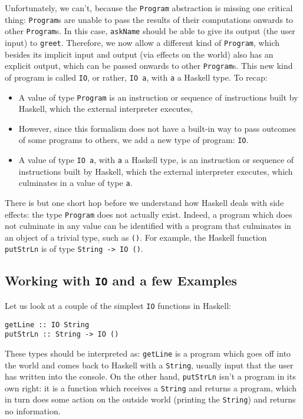 \documentclass[11pt]{article}
\theoremstyle{nonumberplain}
\newcommand*\lsin{\lstinline}
\begin{document}
Unfortunately, we can't, because the \lsin|Program| abstraction is missing one critical thing: \lsin|Program|s are unable to pass the results of their computations onwards to other \lsin|Program|s. In this case, \lsin|askName| should be able to give its output (the user input) to \lsin|greet|. Therefore, we now allow a different kind of \lsin|Program|, which besides its implicit input and output (via effects on the world) also has an explicit output, which can be passed onwards to other \lsin|Program|s. This new kind of program is called \lsin|IO|, or rather, \lsin|IO a|, with \lsin|a| a Haskell type. To recap:
\begin{itemize}
\item A value of type \lsin|Program| is an instruction or sequence of instructions built by Haskell, which the external interpreter executes,
\item However, since this formalism does not have a built-in way to pass outcomes of some programs to others, we add a new type of program: \lsin|IO|.
\item A value of type \lsin|IO a|, with \lsin|a| a Haskell type, is an instruction or sequence of instructions built by Haskell, which the external interpreter executes, which culminates in a value of type \lsin|a|.
\end{itemize}

There is but one short hop before we understand how Haskell deals with side effects: the type \lsin|Program| does not actually exist. Indeed, a program which does not culminate in any value can be identified with a program that culminates in an object of a trivial type, such as \lsin|()|. For example, the Haskell function \lsin|putStrLn| is of type \lsin|String -> IO ()|.

\subsection{Working with \texorpdfstring{\texttt{IO}}{IO} and a few Examples}

Let us look at a couple of the simplest \lsin|IO| functions in Haskell:
\begin{lstlisting}
getLine :: IO String
putStrLn :: String -> IO ()
\end{lstlisting}

These types should be interpreted as: \lsin|getLine| is a program which goes off into the world and comes back to Haskell with a \lsin|String|, usually input that the user has written into the console. On the other hand, \lsin|putStrLn| isn't a program in its own right: it is a function which receives a \lsin|String| and returns a program, which in turn does some action on the outside world (printing the \lsin|String|) and returns no information.
\end{document}
